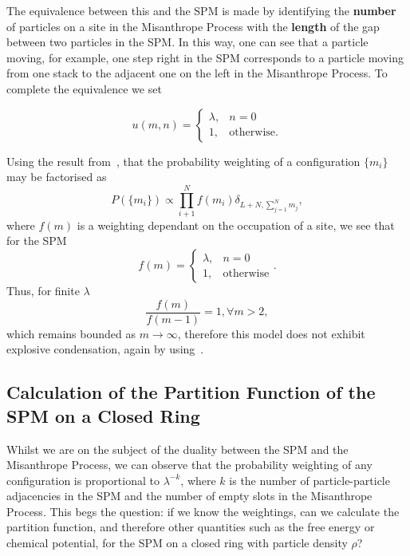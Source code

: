 The equivalence between this and the SPM is made by identifying the \textbf{number} of particles on a site in the Misanthrope Process with the \textbf{length} of the gap between two particles in the SPM. In this way, one can see that a particle
moving, for example, one step right in the SPM corresponds to a particle moving from one stack to the adjacent one on the left in the Misanthrope Process. To complete the equivalence we set


\[
  u(m, n) =
  \begin{cases}
                                   \lambda, & n=0 \\
                                   1, & \text{otherwise.} 
  \end{cases}
\]

Using the result from~\cite{evansWaclaw2014}, that the probability weighting of a configuration $\{m_i\}$ may be factorised as
\begin{equation}
 P(\{m_i\}) \propto \prod_{i+1}^N f(m_i) \delta_{L+N, \sum_{j=1}^N m_j},
\end{equation}
where $f(m)$ is a weighting dependant on the occupation of a site,  we see that for the SPM 
\begin{equation}
 f(m) = 
 \begin{cases}
 \lambda, & n=0 \\
 1, & \text{otherwise}
 \end{cases}.
\end{equation}
Thus, for finite $\lambda$ 
\begin{equation}
 \frac{f(m)}{f(m-1)} = 1, \forall m>2, 
\end{equation}
which remains bounded as $m \rightarrow \infty$, therefore this model does not exhibit explosive condensation, again by using~\cite{evansWaclaw2014}.

\subsection{Calculation of the Partition Function of the SPM on a Closed Ring}

Whilst we are on the subject of the duality between the SPM and the Misanthrope Process, we
can observe that the probability weighting of any configuration is proportional to $\lambda^{-k}$,
where $k$ is the number of particle-particle adjacencies in the SPM and the number of empty slots
in the Misanthrope Process. This begs the question: if we know the weightings, can we calculate the
partition function, and therefore other quantities such as the free energy or chemical potential,
for the SPM on a closed ring with particle density $\rho$?

